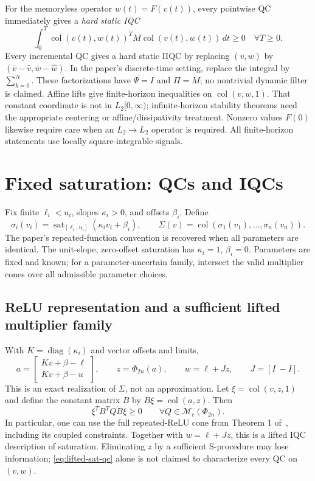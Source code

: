 \documentclass[10pt,a4paper]{article}
\theoremstyle{definition}
\theoremstyle{remark}
\newcommand{\col}{\operatorname{col}}
\newcommand{\diag}{\operatorname{diag}}
\newcommand{\sat}{\operatorname{sat}}
\newcommand{\mc}{\mathcal M_c}
\begin{document}
For the memoryless operator $w(t)=F(v(t))$, every pointwise QC immediately gives a \emph{hard static IQC}
\begin{equation}\label{eq:hard}
 \int_0^T \col(v(t),w(t))^TM\col(v(t),w(t))\,dt\ge0
 \quad\forall T\ge0.
\end{equation}
Every incremental QC gives a hard static IIQC by replacing $(v,w)$ by $(\bar v-\hat v,\bar w-\hat w)$. In the paper's discrete-time setting, replace the integral by $\sum_{k=0}^{N}$. These factorizations have $\Psi=I$ and $\Pi=M$; no nontrivial dynamic filter is claimed. Affine lifts give finite-horizon inequalities on $\col(v,w,1)$. That constant coordinate is not in $L_2[0,\infty)$; infinite-horizon stability theorems need the appropriate centering or affine/dissipativity treatment. Nonzero values $F(0)$ likewise require care when an $L_2\to L_2$ operator is required. All finite-horizon statements use locally square-integrable signals.

\section{Fixed saturation: QCs and IQCs}
Fix finite $\ell_i<u_i$, slopes $\kappa_i>0$, and offsets $\beta_i$. Define
\begin{equation}\label{eq:sat}
 \sigma_i(v_i)=\sat_{[\ell_i,u_i]}(\kappa_i v_i+\beta_i),\qquad
 \Sigma(v)=\col(\sigma_1(v_1),\ldots,\sigma_n(v_n)).
\end{equation}
The paper's repeated-function convention is recovered when all parameters are identical. The unit-slope, zero-offset saturation has $\kappa_i=1$, $\beta_i=0$. Parameters are fixed and known; for a parameter-uncertain family, intersect the valid multiplier cones over all admissible parameter choices.

\subsection{ReLU representation and a sufficient lifted multiplier family}
With $K=\diag(\kappa_i)$ and vector offsets and limits,
\begin{equation}\label{eq:satlift}
 a=\begin{bmatrix}Kv+\beta-\ell\\Kv+\beta-u\end{bmatrix},\qquad
 z=\Phi_{2n}(a),\qquad w=\ell+Jz,\qquad J=[I\ -I].
\end{equation}
This is an exact realization of $\Sigma$, not an approximation. Let $\xi=\col(v,z,1)$ and define the constant matrix $B$ by $B\xi=\col(a,z)$. Then
\begin{equation}\label{eq:lifted-sat-qc}
 \xi^TB^TQB\xi\ge0\qquad\forall Q\in\mc(\Phi_{2n}).
\end{equation}
In particular, one can use the full repeated-ReLU cone from Theorem 1 of~\cite{relu}, including its coupled constraints. Together with $w=\ell+Jz$, this is a lifted IQC description of saturation. Eliminating $z$ by a sufficient S-procedure may lose information; \eqref{eq:lifted-sat-qc} alone is not claimed to characterize every QC on $(v,w)$.
\end{document}
